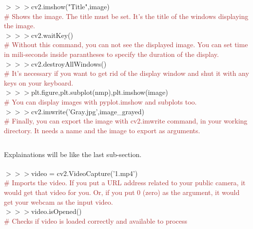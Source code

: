 \documentclass[a4paper,18pt]{article}
\begin{document}
$>>>$cv2.imshow("Title",image)\\{\textcolor{brown}{\# Shows the image. The title must be set. It's the title of the windows displaying the image.}}\\

$>>>$cv2.waitKey()\\{\textcolor{brown}{\# Without this command, you can not see the displayed image. You can set time in mili-seconds inside parantheses to specify the duration of the display.}}\\

$>>>$cv2.destroyAllWindows()\\{\textcolor{brown}{\# It's necessary if you want to get rid of the display window and shut it with any keys on your keyboard.}}\\

$>>>$plt.figure,plt.subplot(nmp),plt.imshow(image)\\{\textcolor{brown}{\# You can display images with pyplot.imshow and subplots too.}}\\

$>>>$cv2.imwrite('Gray.jpg',image\_grayed)\\{\textcolor{brown}{\# Finally, you can export the image with cv2.imwrite command, in your working directory. It needs a name and the image to export as arguments.}}\\


\subsection{\colorbox {matgreen}{\color{white}{\large Primary Works on Video}}}
Explainations will be like the last sub-section.\\\\

$>>>$video = cv2.VideoCapture('1.mp4')\\{\textcolor{brown}{\# Imports the video. If you put a URL address related to your public camera, it would get that video for you. Or, if you put 0 (zero) as the argument, it would get your webcam as the input video.}}\\

$>>>$video.isOpened()\\{\textcolor{brown}{\# Checks if video is loaded correctly and available to process}}\\
\end{document}
